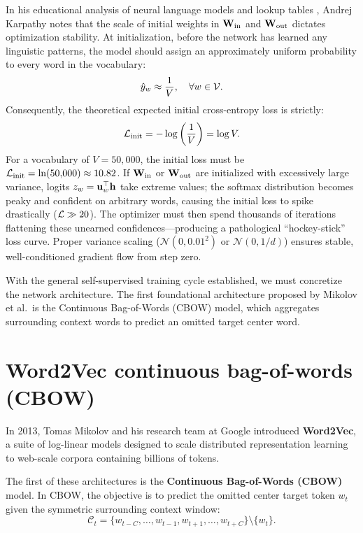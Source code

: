 \documentclass[../../main.tex]{subfiles}
\begin{document}
In his educational analysis of neural language models and lookup tables \cite{karpathy2022makemore}, Andrej Karpathy notes that the scale of initial weights in $\mathbf{W}_{\text{in}}$ and $\mathbf{W}_{\text{out}}$ dictates optimization stability. At initialization, before the network has learned any linguistic patterns, the model should assign an approximately uniform probability to every word in the vocabulary:
\begin{equation}
\label{eq:uniform_prior}
\hat{y}_w \approx \frac{1}{V}, \quad \forall w \in \mathcal{V}.
\end{equation}
Consequently, the theoretical expected initial cross-entropy loss is strictly:
\begin{equation}
\label{eq:expected_initial_loss}
\mathcal{L}_{\text{init}} = -\log \left( \frac{1}{V} \right) = \log V.
\end{equation}
For a vocabulary of $V = 50{,}000$, the initial loss must be $\mathcal{L}_{\text{init}} = \ln(50{,}000) \approx 10.82$. If $\mathbf{W}_{\text{in}}$ or $\mathbf{W}_{\text{out}}$ are initialized with excessively large variance, logits $z_w = \mathbf{u}_w^\top \mathbf{h}$ take extreme values; the softmax distribution becomes peaky and confident on arbitrary words, causing the initial loss to spike drastically ($\mathcal{L} \gg 20$). The optimizer must then spend thousands of iterations flattening these unearned confidences---producing a pathological ``hockey-stick'' loss curve. Proper variance scaling ($\mathcal{N}(0, 0.01^2)$ or $\mathcal{N}(0, 1/d)$) ensures stable, well-conditioned gradient flow from step zero.

With the general self-supervised training cycle established, we must concretize the network architecture. The first foundational architecture proposed by Mikolov et al.~is the Continuous Bag-of-Words (CBOW) model, which aggregates surrounding context words to predict an omitted target center word.

\section{Word2Vec continuous bag-of-words (CBOW)}
\label{sec:cbow_architecture}

In 2013, Tomas Mikolov and his research team at Google \cite{mikolov2013efficient,mikolov2013distributed} introduced \textbf{Word2Vec}, a suite of log-linear models designed to scale distributed representation learning to web-scale corpora containing billions of tokens.

The first of these architectures is the \textbf{Continuous Bag-of-Words (CBOW)} model. In CBOW, the objective is to predict the omitted center target token $w_t$ given the symmetric surrounding context window:
\begin{equation}
\label{eq:cbow_context_def}
\mathcal{C}_t = \{w_{t-C}, \dots, w_{t-1}, w_{t+1}, \dots, w_{t+C}\} \setminus \{w_t\}.
\end{equation}
\end{document}
